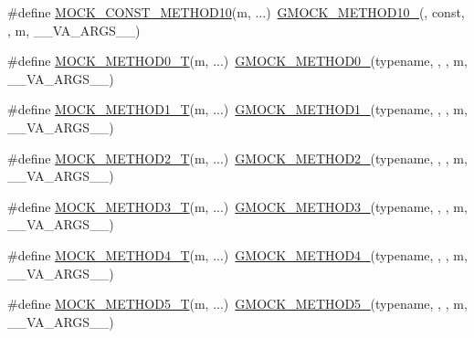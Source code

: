 \begin{DoxyCompactItemize}
\item 
\#define \hyperlink{gmock-generated-function-mockers_8h_a4f16ede0ef660fb6dc49e5f5d226fbf9}{M\+O\+C\+K\+\_\+\+C\+O\+N\+S\+T\+\_\+\+M\+E\+T\+H\+O\+D10}(m, ...)~\hyperlink{gmock-generated-function-mockers_8h_a81a48223a8771de36ef92ac6d56f6e81}{G\+M\+O\+C\+K\+\_\+\+M\+E\+T\+H\+O\+D10\+\_\+}(, const, , m, \+\_\+\+\_\+\+V\+A\+\_\+\+A\+R\+G\+S\+\_\+\+\_\+)
\item 
\#define \hyperlink{gmock-generated-function-mockers_8h_a55a5a1a22cec416ead5605a2da39eec8}{M\+O\+C\+K\+\_\+\+M\+E\+T\+H\+O\+D0\+\_\+T}(m, ...)~\hyperlink{gmock-generated-function-mockers_8h_ae0d290ffa58d7c624b2e3487ba1252f4}{G\+M\+O\+C\+K\+\_\+\+M\+E\+T\+H\+O\+D0\+\_\+}(typename, , , m, \+\_\+\+\_\+\+V\+A\+\_\+\+A\+R\+G\+S\+\_\+\+\_\+)
\item 
\#define \hyperlink{gmock-generated-function-mockers_8h_a8e5b9539726be5c7a13f1aa3bcc1f29f}{M\+O\+C\+K\+\_\+\+M\+E\+T\+H\+O\+D1\+\_\+T}(m, ...)~\hyperlink{gmock-generated-function-mockers_8h_a1bc0012d62440dda77208dabdf4925c9}{G\+M\+O\+C\+K\+\_\+\+M\+E\+T\+H\+O\+D1\+\_\+}(typename, , , m, \+\_\+\+\_\+\+V\+A\+\_\+\+A\+R\+G\+S\+\_\+\+\_\+)
\item 
\#define \hyperlink{gmock-generated-function-mockers_8h_adb6e8d8bd6ab614c62d8ecc2ec163e3c}{M\+O\+C\+K\+\_\+\+M\+E\+T\+H\+O\+D2\+\_\+T}(m, ...)~\hyperlink{gmock-generated-function-mockers_8h_a885295ca6bebb15efb3fc786218c5d47}{G\+M\+O\+C\+K\+\_\+\+M\+E\+T\+H\+O\+D2\+\_\+}(typename, , , m, \+\_\+\+\_\+\+V\+A\+\_\+\+A\+R\+G\+S\+\_\+\+\_\+)
\item 
\#define \hyperlink{gmock-generated-function-mockers_8h_a0b1576f68e6161f106e3d9ee7e3ac28b}{M\+O\+C\+K\+\_\+\+M\+E\+T\+H\+O\+D3\+\_\+T}(m, ...)~\hyperlink{gmock-generated-function-mockers_8h_af7c77ba511c631de02bb8c45a6ed3045}{G\+M\+O\+C\+K\+\_\+\+M\+E\+T\+H\+O\+D3\+\_\+}(typename, , , m, \+\_\+\+\_\+\+V\+A\+\_\+\+A\+R\+G\+S\+\_\+\+\_\+)
\item 
\#define \hyperlink{gmock-generated-function-mockers_8h_a17dde4ac8109f0bf1b73e3509e42c879}{M\+O\+C\+K\+\_\+\+M\+E\+T\+H\+O\+D4\+\_\+T}(m, ...)~\hyperlink{gmock-generated-function-mockers_8h_ab6430f2cfad9de4aca5258ea559294bb}{G\+M\+O\+C\+K\+\_\+\+M\+E\+T\+H\+O\+D4\+\_\+}(typename, , , m, \+\_\+\+\_\+\+V\+A\+\_\+\+A\+R\+G\+S\+\_\+\+\_\+)
\item 
\#define \hyperlink{gmock-generated-function-mockers_8h_a3566f9bd057c5cee1841f55cbf685947}{M\+O\+C\+K\+\_\+\+M\+E\+T\+H\+O\+D5\+\_\+T}(m, ...)~\hyperlink{gmock-generated-function-mockers_8h_a9e3ecd392499ab19a4a6d3adcabf56f6}{G\+M\+O\+C\+K\+\_\+\+M\+E\+T\+H\+O\+D5\+\_\+}(typename, , , m, \+\_\+\+\_\+\+V\+A\+\_\+\+A\+R\+G\+S\+\_\+\+\_\+)

\end{DoxyCompactItemize}
